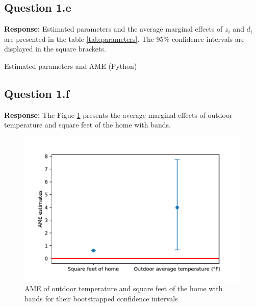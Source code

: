 \documentclass{article}
\begin{document}
\subsection*{Question 1.e}
\textbf{Response:} 
Estimated parameters and the average marginal effects of \(z_i\) and \(d_i\) are presented in the table \ref{tab:parameters}. The 95\% confidence intervals are displayed in the square brackets. 

\begin{table}[hbt!]
    \centering
    
    \caption{Estimated parameters and AME (Python)}
    \label{tab:parameters}
        \end{table}


\subsection*{Question 1.f}
\textbf{Response:} 
The Figue \ref{fig:CI} presents the average marginal effects of outdoor temperature and square feet of the home with
bands.

\begin{figure}[hbt!]
    \centering
    \includegraphics[scale = 0.7]{homework 3/output/figure/hw3ame.pdf}
    \caption{AME of outdoor temperature and square feet of the home with bands for their bootstrapped confidence intervals}
    \label{fig:CI}
\end{figure}
\end{document}
